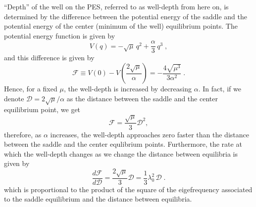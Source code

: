\documentclass{ws-ijbc}
\begin{document}
``Depth'' of the well on the PES, referred to as well-depth from here on, is determined by the difference between the potential energy of the saddle and the potential energy of the center (minimum of the well) equilibrium points. The potential energy function is given by
\begin{equation}
V(q) =  - \sqrt{\mu} \, q^2 + \frac{\alpha}{3} \, q^3 \; ,
\label{pe_1dof}
\end{equation}
and this difference is given by
\begin{equation}
\mathcal{F} \equiv V(0) - V\left(\frac{2\sqrt{\mu}}{\alpha}\right) = - \frac{4 \sqrt{\mu^3}}{3 \alpha^2} \; .
\end{equation}
Hence, for a fixed $\mu$, the well-depth is increased by decreasing $\alpha$. In fact, if we denote $\mathcal{D} = 2\sqrt{\mu} / \alpha$ as the distance between the saddle and the center equilibrium point, we get
\begin{equation}
\mathcal{F} = \dfrac{\sqrt{\mu}}{3} \mathcal{D}^2,
\end{equation}
therefore, as $\alpha$ increases, the well-depth approaches zero faster than the distance between the saddle and the center equlibrium points. Furthermore, the rate at which the well-depth changes as we change the distance between equilibria is given by
\begin{equation}
\dfrac{d \mathcal{F}}{d \mathcal{D}} = \dfrac{2\sqrt{\mu}}{3} \mathcal{D} = \frac{1}{3} \lambda_0^2 \, \mathcal{D} \; .
\end{equation}
which is proportional to the product of the square of the eigefrequency associated to the saddle equilibrium and the distance between equilibria.
\end{document}
